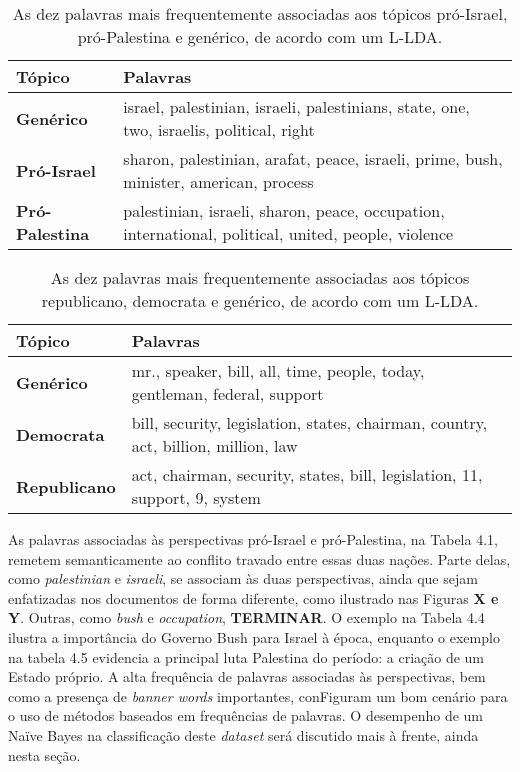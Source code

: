 \begin{table}[h]
\label{tab1}
\centering
\begin{tabular}{| l | p{10cm} | }
\hline
\textbf{Tópico} & \textbf{Palavras} \\ \hline
\textbf{Genérico} & israel, palestinian, israeli, palestinians, state, one, two, israelis, political, right \\ \hline
\textbf{Pró-Israel} & sharon, palestinian, arafat, peace, israeli, prime, bush, minister, american, process \\ \hline
\textbf{Pró-Palestina} & palestinian, israeli, sharon, peace, occupation, international, political, united, people, violence \\ \hline
\end{tabular}
\caption{As dez palavras mais frequentemente associadas aos tópicos pró-Israel, pró-Palestina e genérico, de acordo com um L-LDA.}
\end{table}


\begin{table}[h]
\label{freqs:tab2}
\centering
\begin{tabular}{| l | p{10cm} | }
\hline
\textbf{Tópico} & \textbf{Palavras} \\ \hline
\textbf{Genérico} & mr., speaker, bill, all, time, people, today, gentleman, federal, support \\ \hline
\textbf{Democrata} & bill, security, legislation, states, chairman, country, act, billion, million, law \\ \hline
\textbf{Republicano} & act, chairman, security, states, bill, legislation, 11, support, 9, system \\ \hline
\end{tabular}
\caption{As dez palavras mais frequentemente associadas aos tópicos republicano, democrata e genérico, de acordo com um L-LDA.}
\end{table}


As palavras associadas às perspectivas pró-Israel e pró-Palestina, na Tabela 4.1, remetem semanticamente ao conflito travado entre essas duas nações. Parte delas, como \emph{palestinian} e \emph{israeli}, se associam às duas perspectivas, ainda que sejam enfatizadas nos documentos de forma diferente, como ilustrado nas Figuras \textbf{X e Y}. Outras, como \emph{bush} e \emph{occupation}, \textbf{TERMINAR}. O exemplo na Tabela 4.4 ilustra a importância do Governo Bush para Israel à época, enquanto o exemplo na tabela 4.5 evidencia a principal luta Palestina do período: a criação de um Estado próprio. A alta frequência de palavras associadas às perspectivas, bem como a presença de \emph{banner words} importantes, conFiguram um bom cenário para o uso de métodos baseados em frequências de palavras. O desempenho de um Naïve Bayes na classificação deste \emph{dataset} será discutido mais à frente, ainda nesta seção.

